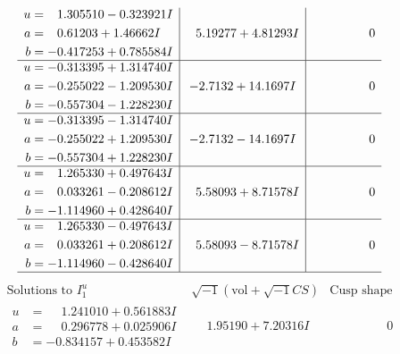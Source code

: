 \documentclass[1p]{elsarticle_modified}
\theoremstyle{definition}
\newcommand{\I}{\sqrt{-1}}
\begin{document}
$$\begin{array}{c|c|c}
\begin{aligned}
u &= \phantom{-}1.305510 - 0.323921 I \\
a &= \phantom{-}0.61203 + 1.46662 I \\
b &= -0.417253 + 0.785584 I\end{aligned}
 & \phantom{-}5.19277 + 4.81293 I & \phantom{-0.000000 } 0 \\ \hline\begin{aligned}
u &= -0.313395 + 1.314740 I \\
a &= -0.255022 - 1.209530 I \\
b &= -0.557304 - 1.228230 I\end{aligned}
 & -2.7132 + 14.1697 I & \phantom{-0.000000 } 0 \\ \hline\begin{aligned}
u &= -0.313395 - 1.314740 I \\
a &= -0.255022 + 1.209530 I \\
b &= -0.557304 + 1.228230 I\end{aligned}
 & -2.7132 - 14.1697 I & \phantom{-0.000000 } 0 \\ \hline\begin{aligned}
u &= \phantom{-}1.265330 + 0.497643 I \\
a &= \phantom{-}0.033261 - 0.208612 I \\
b &= -1.114960 + 0.428640 I\end{aligned}
 & \phantom{-}5.58093 + 8.71578 I & \phantom{-0.000000 } 0 \\ \hline\begin{aligned}
u &= \phantom{-}1.265330 - 0.497643 I \\
a &= \phantom{-}0.033261 + 0.208612 I \\
b &= -1.114960 - 0.428640 I\end{aligned}
 & \phantom{-}5.58093 - 8.71578 I & \phantom{-0.000000 } 0\\
 \hline 
 \end{array}$$\newpage$$\begin{array}{c|c|c}  
\text{Solutions to }I^u_{1}& \I (\text{vol} + \sqrt{-1}CS) & \text{Cusp shape}\\
 \hline 
\begin{aligned}
u &= \phantom{-}1.241010 + 0.561883 I \\
a &= \phantom{-}0.296778 + 0.025906 I \\
b &= -0.834157 + 0.453582 I\end{aligned}
 & \phantom{-}1.95190 + 7.20316 I & \phantom{-0.000000 } 0 \\ \hline\begin{aligned}

\end{aligned}
\end{array}$$
\end{document}
